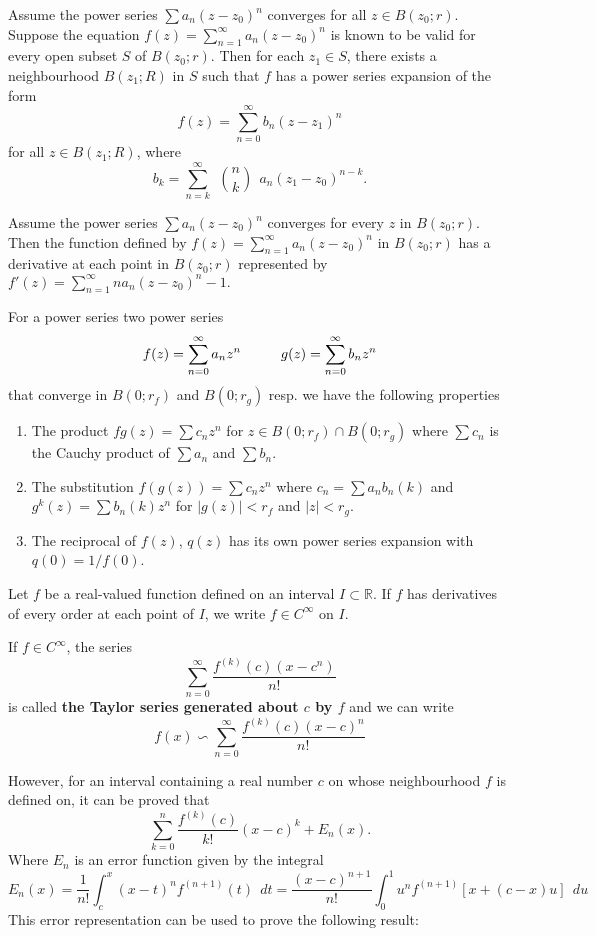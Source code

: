 \documentclass[10pt,a4paper]{book}
\begin{document}
\begin{Thm}
Assume the power series $\sum a_n(z - z_0)^n$ converges for all $z \in B(z_0;r).$ Suppose the equation
$f(z) = \sum_{n=1}^\infty a_n(z-z_0)^n$
is known to be valid for every open subset $S$ of $B(z_0;r)$. Then for each $z_1 \in S$,  there exists a neighbourhood $B(z_1;R)$ in $S$ such that $f$ has a power series expansion of the form
$$f(z) = \sum_{n=0}^{\infty} b_n(z-z_1)^n$$
for all $z \in B(z_1;R)$, where
$$b_k = \sum_{n=k}^\infty \ \ 
{n\choose{k}}\ \ 
a_n(z_1-z_0)^{n-k}.$$
\end{Thm}
\begin{Thm}
Assume the power series $\sum a_n(z-z_0)^n$ converges for every $z$ in $B(z_0;r).$ Then the function defined by
$f(z) = \sum_{n=1}^\infty a_n(z-z_0)^n$
in $B(z_0;r)$ has a derivative at each point in $B(z_0;r)$ represented by
$f'(z) = \sum_{n=1}^\infty na_n(z-z_0)^n-1.$
\end{Thm}
\noindent For a power series two power series 
$$f(z) = \sum_{n=0}^\infty a_nz^n \sp g(z) = \sum_{n=0}^\infty b_nz^n$$
that converge in $B(0;r_f)$ and $B(0;r_g)$ resp. we have the following properties
\begin{enumerate}
    \item The product $fg(z) = \sum c_n z^n$ for $z \in B(0;r_f) \cap B(0;r_g)$ where $\sum c_n$ is the Cauchy product of $\sum a_n$ and $\sum b_n$.
    \item The substitution $f(g(z)) = \sum c_n z^n$ where $c_n = \sum a_n b_n(k)$ and $g^k(z) = \sum b_n(k) z^n$ for $|g(z)| <r_f$ and $|z| < r_g$.
    \item The reciprocal of $f(z)$, $q(z)$ has its own power series expansion with $q(0) = 1/f(0)$.
  \end{enumerate}  
\begin{deff}
   Let $f$ be a real-valued function defined on an interval $I \subset \mathbb{R}$. If $f$ has derivatives of every order at each point of $I$, we write $f \in C^\infty$ on $I.$
\end{deff}
If $f \in C^\infty$, the series
$$\sum_{n=0}^\infty \dfrac{f^{(k)}(c)(x-c^n)}{n!}$$
is called \textbf{the Taylor series generated about $c$ by $f$} and we can write 
$$f(x) \backsim  \sum_{n=0}^\infty \dfrac{f^{(k)}(c)(x-c)^n}{n!}$$
   
However, for an interval containing a real number $c$ on whose neighbourhood $f$ is defined on, it can be proved that
$$\sum_{k=0}^n \dfrac{f^{(k)}(c)}{k!}(x-c)^k + E_n(x).$$
Where $E_n$ is an error function given by the integral
$$E_n(x)= \dfrac{1}{n!}\int_c^x (x-t)^n f^{(n+1)}(t) \ \ dt = \dfrac{(x-c)^{n+1}}{n!} \int_0^1 u^nf^{(n+1)}[x+(c-x)u] \ \ du$$
This error representation can be used to prove the following result:
\end{document}
